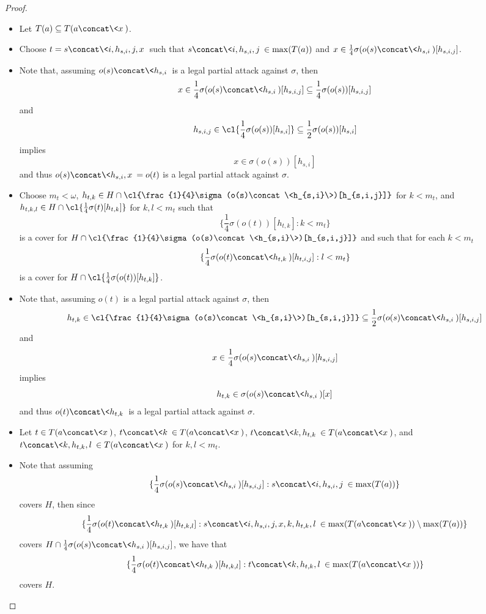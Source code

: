 \begin{proof}
  \begin{itemize}
    \item Let $T(a)\subseteq T(a\concat\<x\>)$.
    \item Choose $t=s\concat\<i,h_{s,i},j,x\>$ such that $s\concat\<i,h_{s,i},j\>\in\max(T(a))$ and $x\in \frac{1}{4}\sigma(o(s)\concat\<h_{s,i}\>)[h_{s,i,j}]$.
    \item Note that, assuming $o(s)\concat\<h_{s,i}\>$ is a legal partial attack against $\sigma$, then
      \[
        x
          \in
        \frac{1}{4}\sigma(o(s)\concat\<h_{s,i}\>)[h_{s,i,j}]
          \subseteq
        \frac{1}{4}\sigma(o(s))[h_{s,i,j}]
      \]
    and
      \[
        h_{s,i,j}
          \in
        \cl{\frac{1}{4}\sigma(o(s))[h_{s,i}]}
          \subseteq
        \frac{1}{2}\sigma(o(s))[h_{s,i}]
      \]
    implies
      \[
        x
          \in
        \sigma(o(s))[h_{s,i}]
      \]
    and thus $o(s)\concat\<h_{s,i},x\>=o(t)$ is a legal partial attack against $\sigma$.
    \item Choose $m_t<\omega$, $h_{t,k}\in H\cap \cl{\frac{1}{4}\sigma(o(s)\concat\<h_{s,i}\>)[h_{s,i,j}]}$ for $k<m_t$, and $h_{t,k,l}\in H\cap\cl{\frac{1}{4}\sigma(t)[h_{t,k}]}$ for $k,l<m_t$ such that
      \[
        \{\frac{1}{4}\sigma(o(t))[h_{t,k}]:k<m_t\}
      \]
    is a cover for $H\cap \cl{\frac{1}{4}\sigma(o(s)\concat\<h_{s,i}\>)[h_{s,i,j}]}$ and such that for each $k<m_t$
      \[
        \{\frac{1}{4}\sigma(o(t)\concat\<h_{t,k}\>)[h_{t,i,j}]:l<m_t\}
      \]
    is a cover for $H\cap\cl{\frac{1}{4}\sigma(o(t))[h_{t,k}]}$.
    \item Note that, assuming $o(t)$ is a legal partial attack against $\sigma$, then
      \[
        h_{t,k}
          \in
        \cl{\frac{1}{4}\sigma(o(s)\concat\<h_{s,i}\>)[h_{s,i,j}]}
          \subseteq
        \frac{1}{2}\sigma(o(s)\concat\<h_{s,i}\>)[h_{s,i,j}]
      \]
    and
      \[
        x
          \in
        \frac{1}{4}\sigma(o(s)\concat\<h_{s,i}\>)[h_{s,i,j}]
      \]
    implies
      \[
        h_{t,k}
          \in
        \sigma(o(s)\concat\<h_{s,i}\>)[x]
      \]
    and thus $o(t)\concat\<h_{t,k}\>$ is a legal partial attack against $\sigma$.
    \item Let $t\in T(a\concat\<x\>)$, $t\concat\<k\>\in T(a\concat\<x\>)$, $t\concat\<k,h_{t,k}\>\in T(a\concat\<x\>)$, and $t\concat\<k,h_{t,k},l\>\in T(a\concat\<x\>)$ for $k,l<m_t$.
    \item Note that assuming
      \[
        \{\frac{1}{4}\sigma(o(s)\concat\<h_{s,i}\>)[h_{s,i,j}] : s\concat\<i,h_{s,i},j\>\in\max(T(a))\}
      \]
    covers $H$, then since
      \[
        \{\frac{1}{4}\sigma(o(t)\concat\<h_{t,k}\>)[h_{t,k,l}] : s\concat\<i,h_{s,i},j,x,k,h_{t,k},l\>\in\max(T(a\concat\<x\>))\setminus\max(T(a))\}
      \]
    covers $H\cap \frac{1}{4}\sigma(o(s)\concat\<h_{s,i}\>)[h_{s,i,j}]$, we have that
      \[
        \{\frac{1}{4}\sigma(o(t)\concat\<h_{t,k}\>)[h_{t,k,l}] : t\concat\<k,h_{t,k},l\>\in\max(T(a\concat\<x\>))\}
      \]
    covers $H$.
  \end{itemize}


\end{proof}
